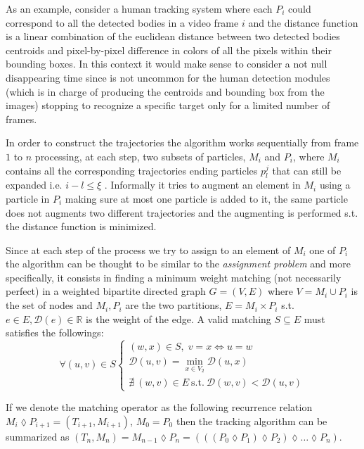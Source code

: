 \documentclass[conference]{IEEEtran}
\begin{document}
As an example, consider a human tracking system where each $P_i$ could correspond to all the detected bodies in a  video frame $i$ and the distance function is a linear combination of the euclidean distance between two detected bodies centroids  and pixel-by-pixel difference in colors of all the pixels within their bounding boxes. In this context it would make sense to consider a not null disappearing time since is not uncommon for the human detection modules (which is in charge of producing the centroids and bounding box from the images) stopping to recognize a specific target only for a limited number of frames. 





In order to construct the trajectories the algorithm works sequentially from frame $1$ to $n$ processing, at each step, two subsets of particles, $M_i$ and $P_{i}$, where $M_i$ contains all the corresponding trajectories ending particles $p^{j}_l$ that can still be expanded i.e. $i-l \leq \xi$ .
Informally it tries to augment an element in $M_i$ using a particle in $P_i$ making sure at most one particle is added to it, the same particle does not augments two different trajectories and the augmenting is performed s.t. the distance function is minimized.

Since at each step of the process we try to assign to an element of $M_i$ one of $P_i$ the algorithm can be thought to be similar to the \textit{assignment problem} \cite{bellmann1978} and more specifically, it consists in finding a minimum weight matching (not necessarily perfect) in  a weighted bipartite directed graph $G=(V,E)$ where $V={M_i} \cup P_i$ is the set of nodes and ${M_i}, P_i$ are the two partitions, $E = {M_i} \times P_i$ s.t. $e \in E, \mathcal{D}(e) \in \mathbb{R}$ is the weight of the edge.
A valid matching $S \subseteq E$ must satisfies the followings: 
\[ \forall (u,v) \in S 
\left\{
  \begin{array}{lr}
   (w,x) \in S,\; v=x\Longleftrightarrow u=w\\
   \mathcal{D}(u,v) = \min_{x \in V_2} \mathcal{D}(u,x)  \\
    \nexists \: (w,v) \in E \: \mbox{s.t.} \: \mathcal{D}(w,v) < \mathcal{D}(u,v)
  \end{array}
\right.
\]

If we denote the matching operator  as the following recurrence relation $  M_i \lozenge P_{i+1} = (T_{i+1},M_{i+1}) $, $M_0=P_0$ then the  tracking algorithm can be summarized as $(T_n,M_n) = M_{n-1} \lozenge P_{n}=(((P_0 \lozenge P_1)\lozenge P_2) \lozenge \ldots \lozenge P_n)$.
\end{document}

